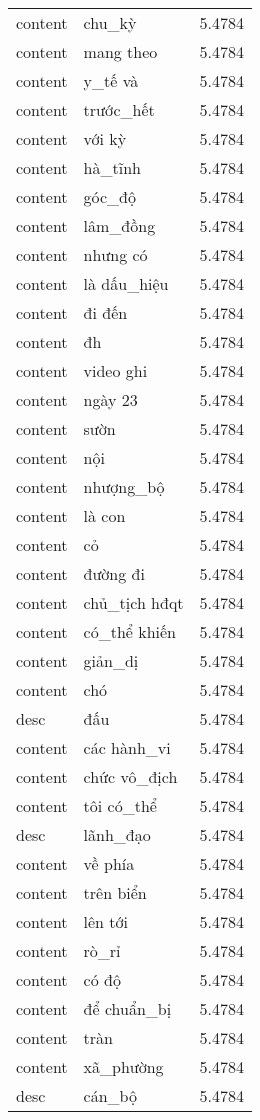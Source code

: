 \documentclass{article}
\begin{document}
\begin{tabular}{lll}
content & chu\_kỳ & 5.4784\\
content & mang theo & 5.4784\\
content & y\_tế và & 5.4784\\
content & trước\_hết & 5.4784\\
content & với kỳ & 5.4784\\
content & hà\_tĩnh & 5.4784\\
content & góc\_độ & 5.4784\\
content & lâm\_đồng & 5.4784\\
content & nhưng có & 5.4784\\
content & là dấu\_hiệu & 5.4784\\
content & đi đến & 5.4784\\
content & đh & 5.4784\\
content & video ghi & 5.4784\\
content & ngày 23 & 5.4784\\
content & sườn & 5.4784\\
content & nội & 5.4784\\
content & nhượng\_bộ & 5.4784\\
content & là con & 5.4784\\
content & cỏ & 5.4784\\
content & đường đi & 5.4784\\
content & chủ\_tịch hđqt & 5.4784\\
content & có\_thể khiến & 5.4784\\
content & giản\_dị & 5.4784\\
content & chó & 5.4784\\
desc & đấu & 5.4784\\
content & các hành\_vi & 5.4784\\
content & chức vô\_địch & 5.4784\\
content & tôi có\_thể & 5.4784\\
desc & lãnh\_đạo & 5.4784\\
content & về phía & 5.4784\\
content & trên biển & 5.4784\\
content & lên tới & 5.4784\\
content & rò\_rỉ & 5.4784\\
content & có độ & 5.4784\\
content & để chuẩn\_bị & 5.4784\\
content & tràn & 5.4784\\
content & xã\_phường & 5.4784\\
desc & cán\_bộ & 5.4784\\

\end{tabular}
\end{document}
